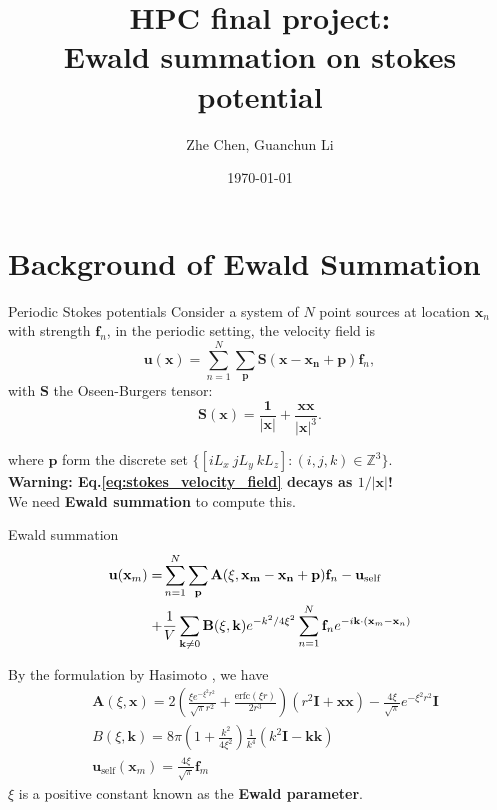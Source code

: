\documentclass{beamer}
\title[HPC Final Project]{HPC final project: \\
	Ewald summation on stokes potential} %
\author{Zhe Chen, Guanchun Li} %
\institute[CIMS] %
{
Courant Insititute of Mathematical sciences \\ %
\medskip
\textit{zc1291@nyu.edu, gl1705@nyu.edu} %
}
\date{\today} %
\begin{document}
\begin{frame}
\titlepage
\end{frame}

\section{Background of Ewald Summation}
\begin{frame}{Periodic Stokes potentials}
Consider a system of $N$ point sources at location $\mathbf{x}_n$ with strength $\mathbf{f}_n$, in the periodic setting, the velocity field is 
\begin{equation}
\mathbf{u}(\mathbf{x}) = \sum_{n=1}^{N} \sum_{\mathbf{p}} \mathbf{S}(\mathbf{x - x_n + p}) \mathbf{f}_n, \label{eq:stokes_velocity_field}
\end{equation} 
with $\mathbf{S}$ the Oseen-Burgers tensor:
\begin{equation}
\mathbf{S}(\mathbf{x}) = \frac{\mathbf{1}}{|\mathbf{x}|} + \frac{\mathbf{x x}}{|\mathbf{x}|^3}.
\end{equation}
 
where $\mathbf{p}$ form the discrete set $\{[iL_x \ jL_y \  kL_z]:(i, j, k) \in \mathbb{Z}^3\}$.\\

\textbf{Warning: Eq.\eqref{eq:stokes_velocity_field} decays as $1 / |\mathbf{x}|$!} \\

We need \textbf{Ewald summation} to compute this.
\end{frame}

\begin{frame}{Ewald summation}
\begin{eqnarray}
\mathbf{u}(\mathbf{x}_m) = &  \sum_{n=1}^{N} \sum_{\mathbf{p}} \mathbf{A}(\xi, \mathbf{x_m - x_n + p}) \mathbf{f}_n  - \mathbf{u}_{\text{self}} \label{eq:ewald_sum} \notag \\ 
+ &  \frac{1}{V} \sum_{\mathbf{k} \neq 0} \mathbf{B}(\xi, \mathbf{k}) e^{-k^2/4\xi^2}\sum_{n=1}^{N} \mathbf{f}_n e ^{-i \mathbf{k} \cdot (\mathbf{x}_m - \mathbf{x}_n)} 
\end{eqnarray} 

By the formulation by Hasimoto \cite{Hasimoto1959}, we have
\begin{eqnarray}
& \mathbf{A}(\xi, \mathbf{x}) = 2 \left(\frac{\xi e^{-\xi^2 r^2}}{\sqrt{\pi} r^2} + \frac{\text{erfc}(\xi r)}{2 r^3}\right) (r^2 \mathbf{I} + \mathbf{x x}) - \frac{4 \xi}{\sqrt{\pi}} e^{-\xi^2 r^2} \mathbf{I} \\
& B(\xi, \mathbf{k}) = 8 \pi \left(1 + \frac{k^2}{4 \xi^2}\right) \frac{1}{k^4}(k^2 \mathbf{I} - \mathbf{k k})\\
& \mathbf{u}_{\text{self}}(\mathbf{x}_m) = \frac{4 \xi}{\sqrt{\pi}} \mathbf{f}_m
\end{eqnarray}
$\xi$ is a positive constant known as the \textbf{Ewald parameter}.
\end{frame}
\end{document}
